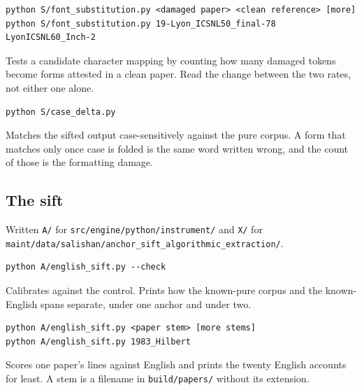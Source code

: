 \begin{lstlisting}[breaklines=true,breakatwhitespace=false,basicstyle=\ttfamily\small]
python S/font_substitution.py <damaged paper> <clean reference> [more]
python S/font_substitution.py 19-Lyon_ICSNL50_final-78 LyonICSNL60_Inch-2
\end{lstlisting}

Tests a candidate character mapping by counting how many damaged tokens become forms attested in a clean paper. Read the change between the two rates, not either one alone.

\begin{lstlisting}[breaklines=true,breakatwhitespace=false,basicstyle=\ttfamily\small]
python S/case_delta.py
\end{lstlisting}

Matches the sifted output case-sensitively against the pure corpus. A form that matches only once case is folded is the same word written wrong, and the count of those is the formatting damage.

\subsection{The sift}

Written \texttt{A/\allowbreak{}} for \texttt{src/\allowbreak{}engine/\allowbreak{}python/\allowbreak{}instrument/\allowbreak{}} and \texttt{X/\allowbreak{}} for \texttt{maint/\allowbreak{}data/\allowbreak{}salishan/\allowbreak{}anchor\_\allowbreak{}sift\_\allowbreak{}algorithmic\_\allowbreak{}extraction/\allowbreak{}}.

\begin{lstlisting}[breaklines=true,breakatwhitespace=false,basicstyle=\ttfamily\small]
python A/english_sift.py --check
\end{lstlisting}

Calibrates against the control. Prints how the known-pure corpus and the known-English spans separate, under one anchor and under two.

\begin{lstlisting}[breaklines=true,breakatwhitespace=false,basicstyle=\ttfamily\small]
python A/english_sift.py <paper stem> [more stems]
python A/english_sift.py 1983_Hilbert
\end{lstlisting}

Scores one paper's lines against English and prints the twenty English accounts for least. A stem is a filename in \texttt{build/\allowbreak{}papers/\allowbreak{}} without its extension.

